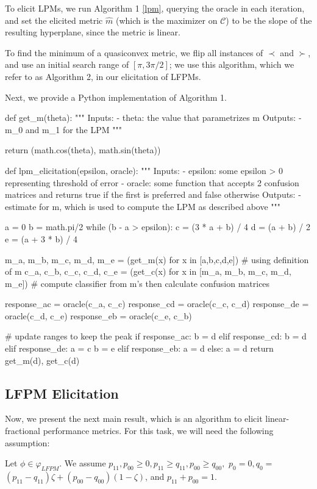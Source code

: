 \documentclass[
  letterpaper,
  DIV=11,
  numbers=noendperiod,
  oneside]{scrreprt}
\theoremstyle{remark}
\begin{document}
To elicit LPMs, we run Algorithm 1 \hyperref[lpm]{{[}lpm{]}}, querying
the oracle in each iteration, and set the elicited metric \(\hat{m}\)
(which is the maximizer on \(\mathcal{C}\)) to be the slope of the
resulting hyperplane, since the metric is linear.

To find the minimum of a quasiconvex metric, we flip all instances of
\(\prec\) and \(\succ\), and use an initial search range of
\([\pi, 3\pi/2]\); we use this algorithm, which we refer to as Algorithm
2, in our elicitation of LFPMs.

Next, we provide a Python implementation of Algorithm 1.

def get\_m(theta): """ Inputs: - theta: the value that parametrizes m
Outputs: - m\_0 and m\_1 for the LPM """

return (math.cos(theta), math.sin(theta))

def lpm\_elicitation(epsilon, oracle): """ Inputs: - epsilon: some
epsilon \textgreater{} 0 representing threshold of error - oracle: some
function that accepts 2 confusion matrices and returns true if the first
is preferred and false otherwise Outputs: - estimate for m, which is
used to compute the LPM as described above """

a = 0 b = math.pi/2 while (b - a \textgreater{} epsilon): c = (3 * a +
b) / 4 d = (a + b) / 2 e = (a + 3 * b) / 4

m\_a, m\_b, m\_c, m\_d, m\_e = (get\_m(x) for x in {[}a,b,c,d,e{]}) \#
using definition of m c\_a, c\_b, c\_c, c\_d, c\_e = (get\_c(x) for x in
{[}m\_a, m\_b, m\_c, m\_d, m\_e{]}) \# compute classifier from m's then
calculate confusion matrices

response\_ac = oracle(c\_a, c\_c) response\_cd = oracle(c\_c, c\_d)
response\_de = oracle(c\_d, c\_e) response\_eb = oracle(c\_e, c\_b)

\# update ranges to keep the peak if response\_ac: b = d elif
response\_cd: b = d elif response\_de: a = c b = e elif response\_eb: a
= d else: a = d return get\_m(d), get\_c(d)

\subsection{LFPM Elicitation}\label{sec:orga500da1}

Now, we present the next main result, which is an algorithm to elicit
linear-fractional performance metrics. For this task, we will need the
following assumption:

Let \(\phi \in \varphi_{L F P M}\). We assume
\(p_{11}, p_{00} \geq 0, p_{11} \geq q_{11}, p_{00} \geq q_{00},\)
\(p_{0}=0, q_{0}=\)
\(\left(p_{11}-q_{11}\right) \zeta+\left(p_{00}-q_{00}\right)(1-\zeta)\),
and \(p_{11}+p_{00}=1\).
\end{document}

